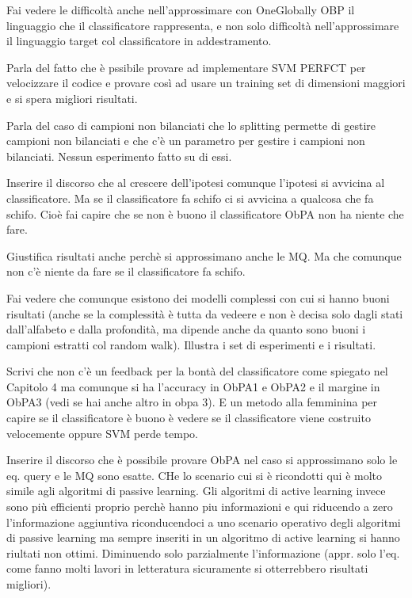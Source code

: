 Fai vedere le difficoltà anche nell'approssimare con OneGlobally OBP il linguaggio che il classificatore rappresenta, e non solo difficoltà nell'approssimare il linguaggio target col classificatore in addestramento.

Parla del fatto che è pssibile provare ad implementare SVM PERFCT per velocizzare il codice e provare così ad usare un training set di dimensioni maggiori e si spera migliori risultati.

Parla del caso di campioni non bilanciati che lo splitting permette di gestire campioni non bilanciati e che c'è un parametro per gestire i campioni non bilanciati. Nessun esperimento fatto su di essi.

Inserire il discorso che al crescere dell'ipotesi comunque l'ipotesi si avvicina al classificatore. Ma se il classificatore fa schifo ci si avvicina a qualcosa che fa schifo. Cioè fai capire che se non è buono il classificatore ObPA non ha niente che fare.

Giustifica risultati anche perchè si approssimano anche le MQ. Ma che comunque non c'è niente da fare se il classificatore fa schifo.



Fai vedere che comunque esistono dei modelli complessi con cui si hanno buoni risultati (anche se la complessità è tutta da vedeere e non è decisa solo dagli stati dall'alfabeto e dalla profondità, ma dipende anche da quanto sono buoni i campioni estratti col random walk).
Illustra i set di esperimenti e i risultati.

Scrivi che non c'è un feedback per la bontà del classificatore come spiegato nel Capitolo 4 ma comunque si ha l'accuracy in ObPA1 e ObPA2 e il margine in ObPA3 (vedi se hai anche altro in obpa 3). E un metodo alla femminina per capire se il classificatore è buono è vedere se il classificatore viene costruito velocemente oppure SVM perde tempo. 






Inserire il discorso che è possibile provare ObPA nel caso si approssimano solo le eq. query e le MQ sono esatte. CHe lo scenario cui si è ricondotti qui è molto simile agli algoritmi di passive learning. Gli algoritmi di active learning invece sono più efficienti proprio perchè hanno piu informazioni e qui riducendo a zero l'informazione aggiuntiva riconducendoci a uno scenario operativo degli algoritmi di passive learning ma sempre inseriti in un algoritmo di active learning si hanno riultati non ottimi. Diminuendo solo parzialmente l'informazione (appr. solo l'eq. come fanno molti lavori in letteratura sicuramente si otterrebbero risultati migliori).

